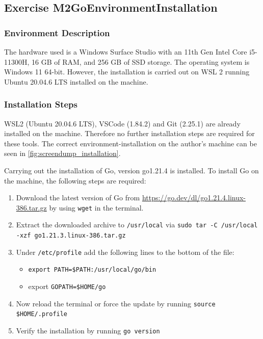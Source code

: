 \label{sec:exercise_install_go_env}

\subsection{Exercise M2GoEnvironmentInstallation}
\label{sec:exercise_m2go_environment_installation}

\subsubsection*{Environment Description}
The hardware used is a Windows Surface Studio with an 11th Gen Intel Core i5-11300H, 16 GB of RAM, and 256 GB of SSD storage.
The operating system is Windows 11 64-bit. However, the installation is carried out on WSL 2 running Ubuntu 20.04.6 LTS installed on the machine.

\subsubsection*{Installation Steps}
WSL2 (Ubuntu 20.04.6 LTS), VSCode (1.84.2) and Git (2.25.1) are already installed on the machine. 
Therefore no further installation steps are required for these tools.
The correct environment-installation on the author's machine can be seen in \autoref{fig:screendump_installation}.

Carrying out the installation of Go, version go1.21.4 is installed.
To install Go on the machine, the following steps are required:
\begin{enumerate}
    \item Download the latest version of Go from \url{https://go.dev/dl/go1.21.4.linux-386.tar.gz} by using  \texttt{wget} in the terminal.
    \item Extract the downloaded archive to \texttt{/usr/local} via \texttt{sudo tar -C /usr/local -xzf go1.21.3.linux-386.tar.gz}
    \item Under \texttt{/etc/profile} add the following lines to the bottom of the file: 
    \begin{itemize}
        \item \texttt{export PATH=\$PATH:/usr/local/go/bin}
        \item export \texttt{GOPATH=\$HOME/go}
    \end{itemize}
    \item Now reload the terminal or force the update by running \texttt{source \$HOME/.profile}
    \item Verify the installation by running \texttt{go version}
\end{enumerate}

